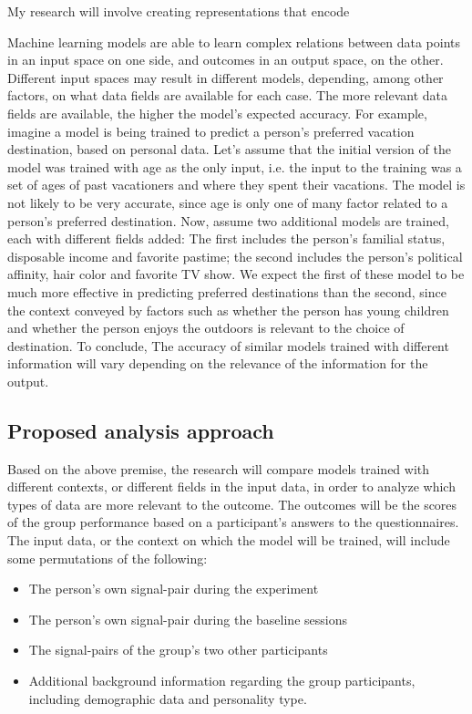 \documentclass[a4paper, 11pt]{article}      %
\begin{document}
My research will involve creating representations that encode 


Machine learning models are able to learn complex relations between data points in an input space on one side, and outcomes in an output space, on the other. Different input spaces may result in different models, depending, among other factors, on what data fields are available for each case. The more relevant data fields are available, the higher the model's expected accuracy. For example, imagine a model is being trained to predict a person's preferred vacation destination, based on personal data. Let's assume that the initial version of the model was trained with age as the only input, i.e. the input to the training was a set of ages of past vacationers and where they spent their vacations. The model is not likely to be very accurate, since age is only one of many factor related to a person's preferred destination. Now, assume two additional models are trained, each with different fields added: The first includes the person's familial status, disposable income and favorite pastime; the second includes the person's political affinity, hair color and favorite TV show. We expect the first of these model to be much more effective in predicting preferred destinations than the second, since the context conveyed by factors such as whether the person has young children and whether the person enjoys the outdoors is relevant to the choice of destination. To conclude, The accuracy of similar models trained with different information will vary depending on the relevance of the information for the output.

\subsection{Proposed analysis approach}
Based on the above premise, the research will compare models trained with different contexts, or different fields in the input data, in order to analyze which types of data are more relevant to the outcome. The outcomes will be the scores of the group performance based on a participant's answers to the questionnaires. The input data, or the context on which the model will be trained, will include some permutations of the following:
\begin{itemize}
    \item The person's own signal-pair during the experiment
    \item The person's own signal-pair during the baseline sessions
    \item The signal-pairs of the  group's two other participants 
    \item Additional background information regarding the group participants, including demographic data and personality type.
\end{itemize}
\end{document}

